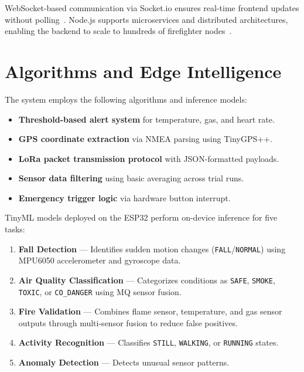 \documentclass[conference]{IEEEtran}
\begin{document}
	WebSocket-based communication via Socket.io ensures real-time frontend updates
	without polling~\cite{chaplia2023}. Node.js supports microservices and
	distributed architectures, enabling the backend to scale to hundreds of
	firefighter nodes~\cite{chaplia2023}.
	
	\section{Algorithms and Edge Intelligence}
	
	The system employs the following algorithms and inference models:
	
	\begin{itemize}
		\item \textbf{Threshold-based alert system} for temperature, gas, and heart rate.
		\item \textbf{GPS coordinate extraction} via NMEA parsing using TinyGPS++.
		\item \textbf{LoRa packet transmission protocol} with JSON-formatted payloads.
		\item \textbf{Sensor data filtering} using basic averaging across trial runs.
		\item \textbf{Emergency trigger logic} via hardware button interrupt.
	\end{itemize}
	
	TinyML models deployed on the ESP32 perform on-device inference for five tasks:
	
	\begin{enumerate}
		\item \textbf{Fall Detection} --- Identifies sudden motion changes
		(\texttt{FALL}/\texttt{NORMAL}) using MPU6050 accelerometer and
		gyroscope data.
		\item \textbf{Air Quality Classification} --- Categorizes conditions as
		\texttt{SAFE}, \texttt{SMOKE}, \texttt{TOXIC}, or \texttt{CO\_DANGER}
		using MQ sensor fusion.
		\item \textbf{Fire Validation} --- Combines flame sensor, temperature, and
		gas sensor outputs through multi-sensor fusion to reduce false positives.
		\item \textbf{Activity Recognition} --- Classifies
		\texttt{STILL}, \texttt{WALKING}, or \texttt{RUNNING} states.
		\item \textbf{Anomaly Detection} --- Detects unusual sensor patterns.
	\end{enumerate}
	
\end{document}
